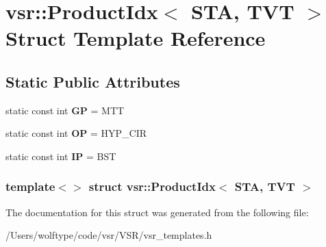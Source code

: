\hypertarget{structvsr_1_1_product_idx_3_01_s_t_a_00_01_t_v_t_01_4}{\section{vsr\-:\-:Product\-Idx$<$ S\-T\-A, T\-V\-T $>$ Struct Template Reference}
\label{structvsr_1_1_product_idx_3_01_s_t_a_00_01_t_v_t_01_4}
}
\subsection*{Static Public Attributes}
\begin{DoxyCompactItemize}
\item 
\hypertarget{structvsr_1_1_product_idx_3_01_s_t_a_00_01_t_v_t_01_4_a47d0b45cb44eafcc9e715c2d631cb102}{static const int {\bfseries G\-P} = M\-T\-T}\label{structvsr_1_1_product_idx_3_01_s_t_a_00_01_t_v_t_01_4_a47d0b45cb44eafcc9e715c2d631cb102}

\item 
\hypertarget{structvsr_1_1_product_idx_3_01_s_t_a_00_01_t_v_t_01_4_a5ec854017515e1fa0aa5e8d45fcafbb7}{static const int {\bfseries O\-P} = H\-Y\-P\-\_\-\-C\-I\-R}\label{structvsr_1_1_product_idx_3_01_s_t_a_00_01_t_v_t_01_4_a5ec854017515e1fa0aa5e8d45fcafbb7}

\item 
\hypertarget{structvsr_1_1_product_idx_3_01_s_t_a_00_01_t_v_t_01_4_af8a4ceffbd9d69f5462431136331d7af}{static const int {\bfseries I\-P} = B\-S\-T}\label{structvsr_1_1_product_idx_3_01_s_t_a_00_01_t_v_t_01_4_af8a4ceffbd9d69f5462431136331d7af}

\end{DoxyCompactItemize}
\subsubsection*{template$<$$>$ struct vsr\-::\-Product\-Idx$<$ S\-T\-A, T\-V\-T $>$}



The documentation for this struct was generated from the following file\-:\begin{DoxyCompactItemize}
\item 
/\-Users/wolftype/code/vsr/\-V\-S\-R/vsr\-\_\-templates.\-h\end{DoxyCompactItemize}
